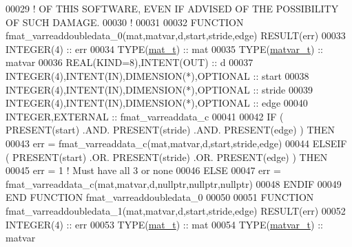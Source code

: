 \begin{DoxyCode}
00029 \textcolor{comment}{! OF THIS SOFTWARE, EVEN IF ADVISED OF THE POSSIBILITY OF SUCH DAMAGE.}
00030 \textcolor{comment}{!}
00031 
00032 \textcolor{keyword}{FUNCTION }fmat\_varreaddoubledata\_0(mat,matvar,d,start,stride,edge) \textcolor{keyword}{RESULT}(err)
00033     \textcolor{keywordtype}{INTEGER(4)}                                  :: err
00034     \textcolor{keywordtype}{TYPE}(\hyperlink{group___m_a_t_gab0fc888f5a5d79943b16284b1f91c2e8}{mat\_t})                                 :: mat
00035     \textcolor{keywordtype}{TYPE}(\hyperlink{group___m_a_t_structmatvar__t}{matvar\_t})                              :: matvar
00036     \textcolor{keywordtype}{REAL(KIND=8)},\textcolor{keywordtype}{INTENT(OUT)}                    :: d
00037     \textcolor{keywordtype}{INTEGER(4)},\textcolor{keywordtype}{INTENT(IN)},\textcolor{keywordtype}{DIMENSION(*)},\textcolor{keywordtype}{OPTIONAL} :: start
00038     \textcolor{keywordtype}{INTEGER(4)},\textcolor{keywordtype}{INTENT(IN)},\textcolor{keywordtype}{DIMENSION(*)},\textcolor{keywordtype}{OPTIONAL} :: stride
00039     \textcolor{keywordtype}{INTEGER(4)},\textcolor{keywordtype}{INTENT(IN)},\textcolor{keywordtype}{DIMENSION(*)},\textcolor{keywordtype}{OPTIONAL} :: edge
00040     \textcolor{keywordtype}{INTEGER},\textcolor{keywordtype}{EXTERNAL}                            :: fmat\_varreaddata\_c
00041 
00042     \textcolor{keywordflow}{IF} ( \textcolor{keyword}{PRESENT}(start) .AND. \textcolor{keyword}{PRESENT}(stride) .AND. \textcolor{keyword}{PRESENT}(edge) ) \textcolor{keywordflow}{THEN}
00043         err = fmat\_varreaddata\_c(mat,matvar,d,start,stride,edge)
00044     \textcolor{keywordflow}{ELSEIF} ( \textcolor{keyword}{PRESENT}(start) .OR. \textcolor{keyword}{PRESENT}(stride) .OR. \textcolor{keyword}{PRESENT}(edge) ) \textcolor{keywordflow}{THEN}
00045         err = 1    \textcolor{comment}{! Must have all 3 or none}
00046     \textcolor{keywordflow}{ELSE}
00047         err = fmat\_varreaddata\_c(mat,matvar,d,nullptr,nullptr,nullptr)
00048 \textcolor{keywordflow}{    ENDIF}
00049 \textcolor{keyword}{END FUNCTION }fmat\_varreaddoubledata\_0
00050 
00051 \textcolor{keyword}{FUNCTION }fmat\_varreaddoubledata\_1(mat,matvar,d,start,stride,edge) \textcolor{keyword}{RESULT}(err)
00052     \textcolor{keywordtype}{INTEGER(4)}                                  :: err
00053     \textcolor{keywordtype}{TYPE}(\hyperlink{group___m_a_t_gab0fc888f5a5d79943b16284b1f91c2e8}{mat\_t})                                 :: mat
00054     \textcolor{keywordtype}{TYPE}(\hyperlink{group___m_a_t_structmatvar__t}{matvar\_t})                              :: matvar

\end{DoxyCode}
